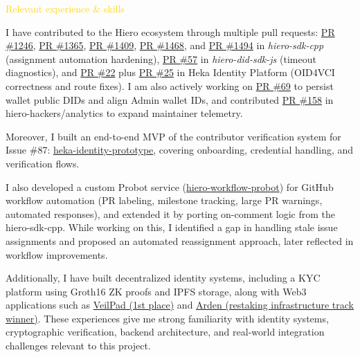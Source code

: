 \documentclass[11pt]{article}
\begin{document}
{\fontsize{15pt}{18pt}\selectfont\textcolor{gold}{Relevant experience \& skills}}

I have contributed to the Hiero ecosystem through multiple pull requests: \href{https://github.com/hiero-ledger/hiero-sdk-cpp/pull/1246}{PR \#1246}, \href{https://github.com/hiero-ledger/hiero-sdk-cpp/pull/1365}{PR \#1365}, \href{https://github.com/hiero-ledger/hiero-sdk-cpp/pull/1409}{PR \#1409}, \href{https://github.com/hiero-ledger/hiero-sdk-cpp/pull/1468}{PR \#1468}, and \href{https://github.com/hiero-ledger/hiero-sdk-cpp/pull/1494}{PR \#1494} in \textit{hiero-sdk-cpp} (assignment automation hardening), \href{https://github.com/hiero-ledger/hiero-did-sdk-js/pull/57}{PR \#57} in \textit{hiero-did-sdk-js} (timeout diagnostics), and \href{https://github.com/hiero-ledger/heka-identity-platform/pull/22}{PR \#22} plus \href{https://github.com/hiero-ledger/heka-identity-platform/pull/25}{PR \#25} in Heka Identity Platform (OID4VCI correctness and route fixes). I am also actively working on \href{https://github.com/hiero-ledger/heka-identity-platform/pull/69}{PR \#69} to persist wallet public DIDs and align Admin wallet IDs, and contributed \href{https://github.com/hiero-hackers/analytics/pull/158}{PR \#158} in hiero-hackers/analytics to expand maintainer telemetry.

Moreover, I built an end-to-end MVP of the contributor verification system for Issue \#87: \href{https://github.com/darshit2308/heka-identity-prototype}{heka-identity-prototype}, covering onboarding, credential handling, and verification flows.

I also developed a custom Probot service (\href{https://github.com/darshit2308/hiero-workflow-probot}{hiero-workflow-probot}) for GitHub workflow automation (PR labeling, milestone tracking, large PR warnings, automated responses), and extended it by porting on-comment logic from the hiero-sdk-cpp. While working on this, I identified a gap in handling stale issue assignments and proposed an automated reassignment approach, later reflected in workflow improvements.

Additionally, I have built decentralized identity systems, including a KYC platform using Groth16 ZK proofs and IPFS storage, along with Web3 applications such as \href{https://devfolio.co/projects/veilpad-2991}{VeilPad (1st place)} and \href{https://taikai.network/swellchain/hackathons/Swell-City-Buildathon/projects/cma45ss5e0c8dne4ug62e5j1g/idea}{Arden (restaking infrastructure track winner)}. These experiences give me strong familiarity with identity systems, cryptographic verification, backend architecture, and real-world integration challenges relevant to this project.
\end{document}
